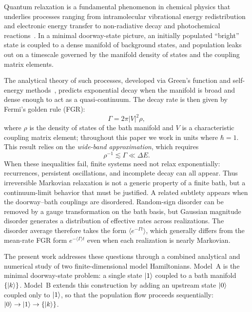 \documentclass[aps,prx,reprint,showpacs,showkeys,floatfix]{revtex4-2}
\begin{document}
Quantum relaxation is a fundamental phenomenon in chemical physics that
underlies processes ranging from intramolecular vibrational energy
redistribution and electronic energy transfer to non-radiative decay and
photochemical reactions~\cite{Nitzan}.  In a minimal doorway-state picture,
an initially populated ``bright'' state is coupled to a dense manifold of
background states, and population leaks out on a timescale governed by the
manifold density of states and the coupling matrix elements.

The analytical theory of such processes, developed via Green's function and
self-energy methods~\cite{Nitzan,Weiss}, predicts exponential decay when the
manifold is broad and dense enough to act as a quasi-continuum.  The decay
rate is then given by Fermi's golden rule (FGR):
\begin{equation}
    \Gamma = 2\pi|V|^2\rho,
    \label{eq:FGR}
\end{equation}
where $\rho$ is the density of states of the bath manifold and $V$ is a
characteristic coupling matrix element; throughout this paper we work in
units where $\hbar=1$.  This result relies on the \emph{wide-band
approximation}, which requires
\begin{equation}
    \rho^{-1} \lesssim \Gamma \ll \Delta E.
    \label{eq:wideband}
\end{equation}
When these inequalities fail, finite systems need not relax exponentially:
recurrences, persistent oscillations, and incomplete decay can all appear.
Thus irreversible Markovian relaxation is not a generic property of a
finite bath, but a continuum-limit behavior that must be justified.  A
related subtlety appears when the doorway--bath couplings are disordered.
Random-sign disorder can be removed by a gauge transformation on the bath
basis, but Gaussian magnitude disorder generates a distribution of effective
rates across realizations.  The disorder average therefore takes the form
$\langle e^{-\Gamma t}\rangle$, which generally differs from the mean-rate
FGR form $e^{-\langle\Gamma\rangle t}$ even when each realization is nearly
Markovian.

The present work addresses these questions through a combined analytical and
numerical study of two finite-dimensional model Hamiltonians.  Model~A is
the minimal doorway-state problem: a single state $\ket{1}$ coupled to a
bath manifold $\{\ket{k}\}$.  Model~B extends this construction by adding an
upstream state $\ket{0}$ coupled only to $\ket{1}$, so that the population
flow proceeds sequentially: $\ket{0}\to\ket{1}\to\{\ket{k}\}$.
\end{document}
